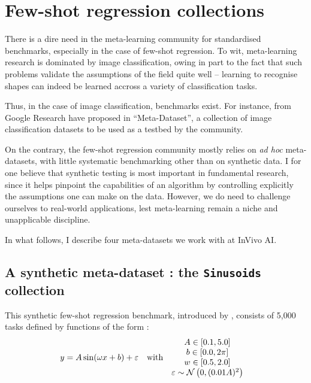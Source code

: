 \appendix

\section{Few-shot regression collections}
\label{app:collections}

There is a dire need in the meta-learning community for standardised benchmarks, especially in the case of few-shot regression. To wit, meta-learning research is dominated by image classification, owing in part to the fact that such problems validate the assumptions of the field quite well -- learning to recognise shapes can indeed be learned accross a variety of classification tasks.

Thus, in the case of image classification, benchmarks exist. For instance, \citeauthor{triantafillou2019metadataset} from Google Research have proposed in \citeyear{triantafillou2019metadataset} ``Meta-Dataset'', a collection of image classification datasets to be used as a testbed by the community.

On the contrary, the few-shot regression community mostly relies on \textit{ad hoc} meta-datasets, with little systematic benchmarking other than on synthetic data. I for one believe that synthetic testing is most important in fundamental research, since it helps pinpoint the capabilities of an algorithm by controlling explicitly the assumptions one can make on the data. However, we do need to challenge ourselves to real-world applications, lest meta-learning remain a niche and unapplicable discipline.

In what follows, I describe four meta-datasets we work with at InVivo AI.

\subsection{A synthetic meta-dataset : the \texttt{Sinusoids} collection}
\label{app:collections-synthetic}

This synthetic few-shot regression benchmark, introduced by \citet{kim2018bayesian}, consists of 5,000 tasks defined by functions of the form :
\begin{align}
  y &= A \sin(\omega x + b) + \varepsilon &
  &\text{with}&
  &
  \begin{matrix}
    A \in \left[ 0.1, 5.0 \right] \\
    b \in \left[ 0.0, 2\pi \right] \\
    w \in \left[ 0.5, 2.0 \right] \\
    \varepsilon \sim {\mathcal{N}} \left( 0,(0.01 A)^2 \right)
  \end{matrix}&
\end{align}

